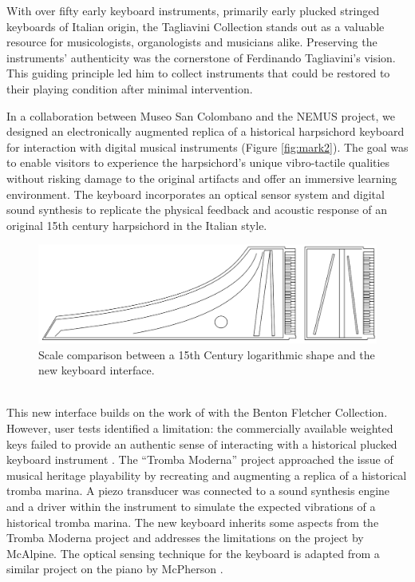With over fifty early keyboard instruments, primarily early plucked stringed keyboards of Italian origin, the Tagliavini Collection stands out as a valuable resource for musicologists, organologists and musicians alike. Preserving the instruments' authenticity was the cornerstone of Ferdinando Tagliavini’s vision. This guiding principle led him to collect instruments that could be restored to their playing condition after minimal intervention. 

In a collaboration between Museo San Colombano and the NEMUS project, we designed an electronically augmented replica of a historical harpsichord keyboard for interaction with digital musical instruments (Figure \ref{fig:mark2}). The goal was to enable visitors to experience the harpsichord’s unique vibro-tactile qualities without risking damage to the original artifacts and offer an immersive learning environment. The keyboard incorporates an optical sensor system and digital sound synthesis to replicate the physical feedback and acoustic response of an original 15th century harpsichord in the Italian style.

\begin{figure}
    \centering
    \includegraphics[width=1\linewidth]{img/comparison.png}
    \caption{Scale comparison between a 15th Century logarithmic shape and the new keyboard interface.}
    \label{fig:log-harp-comp}
\end{figure}
\\

This new interface builds on the work of \textcite{mcalpine_sampling_2014} with the Benton Fletcher Collection. However, user tests identified a limitation: the commercially available weighted keys failed to provide an authentic sense of interacting with a historical plucked keyboard instrument \cite{mcalpine_sampling_2014}. The ``Tromba Moderna'' project \cite{baldwin_tromba_2016} approached the issue of musical heritage playability by recreating and augmenting a replica of a historical tromba marina. A piezo transducer was connected to a sound synthesis engine and a driver within the instrument to simulate the expected vibrations of a historical tromba marina. The new keyboard inherits some aspects from the Tromba Moderna project and addresses the limitations on the project by McAlpine. The optical sensing technique for the keyboard is adapted from a similar project on the piano by McPherson \cite{mcpherson_portable_2013}.

